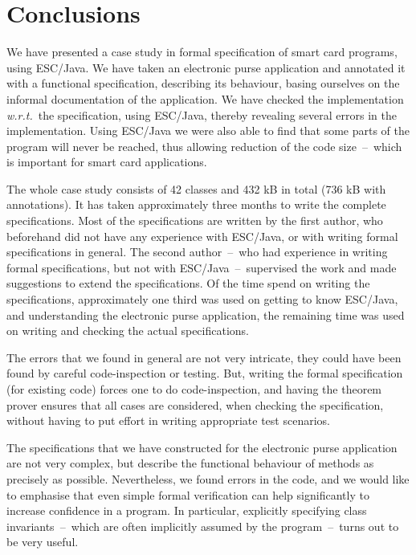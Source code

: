 \documentclass[a4paper]{llncs}
\begin{document}
\section{Conclusions}
\label{SectConcl}

We have presented a case study in formal specification of smart card
programs, using ESC/Java. We have taken an electronic purse
application and annotated it with a functional specification,
describing its behaviour, basing ourselves on the informal
documentation of the application. We have checked the implementation
\emph{w.r.t.}~the specification, using ESC/Java, thereby revealing
several errors in the implementation. Using ESC/Java we were also able 
to find that some parts of the program will never be reached, thus
allowing reduction of the code size~--~which is important for smart
card applications. 

The whole case study consists of 42 classes and 432 kB in total (736
kB with annotations).  It has taken approximately three months to
write the complete specifications. Most of the specifications are
written by the first author, who beforehand did not have any
experience with ESC/Java, or with writing formal specifications in
general. The second author~--~who had experience in writing formal
specifications, but not with ESC/Java~--~supervised the work and made
suggestions to extend the specifications. Of the time spend on writing
the specifications, approximately one third was used on getting to
know ESC/Java, and understanding the electronic purse application, the
remaining time was used on writing and checking the actual
specifications.


The errors that we found in general are not very intricate, they could
have been found by careful code-inspection or testing. But, writing
the formal specification (for existing code) forces one to do
code-inspection, and having the theorem prover ensures that all
cases are considered, when checking the specification, without having
to put effort in writing appropriate test scenarios.

The specifications that we have constructed for the electronic purse
application are not very complex, but describe the functional
behaviour of methods as precisely as possible. Nevertheless, we found
errors in the code, and we would like to emphasise that even simple
formal verification can help significantly to increase confidence in a
program. In particular, explicitly specifying class invariants~--~which are often implicitly assumed by the program~--~turns
out to be very useful.
\end{document}

